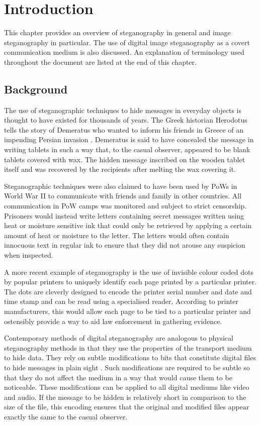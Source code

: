 \chapter{Introduction}
\label{ch:intro}
This chapter provides an overview of steganography in general and image steganography in particular. The use of digital image steganography as a covert communication medium is also discussed. An explanation of terminology used throughout the document are listed at the end of this chapter. 
\section{Background}
The use of steganographic techniques to hide messages in everyday objects is thought to have existed for thousands of years. The Greek historian Herodotus tells the story of Demeratus who wanted to inform his friends in Greece of an impending Persian invasion  \cite{kahn1996history}. Demeratus is said to have concealed the message in writing tablets in such a way that, to the casual observer, appeared to be blank tablets covered with wax. The hidden message inscribed on the wooden tablet itself and was recovered by the recipients after melting the wax covering it. 
\par Steganographic techniques were also claimed to have been used by PoWs in World War II to communicate with friends and family in other countries. All communication in PoW camps was monitored and subject to strict censorship. Prisoners would instead write letters containing secret messages written using heat or moisture sensitive ink that could only be retrieved by applying a certain amount of heat or moisture to the letter. The letters would often contain innocuous text in regular ink to ensure that they did not arouse any suspicion when inspected.
\par A more recent example of steganography is the use of invisible colour coded dots by popular printers \cite{stegprinter} to uniquely identify each page printed by a particular printer. The dots are cleverly designed to encode the printer serial number and date and time stamp and can be read using a specialised reader. According to printer manufacturers, this would allow each page to be tied to a particular printer and ostensibly provide a way to aid law enforcement in gathering evidence. 
\par Contemporary methods of digital steganography are analogous to physical steganography methods in that they use the properties of the transport medium to hide data. They rely on subtle modifications to bits that constitute digital files to hide messages in plain sight  \cite{hinson2009introduction}.  Such modifications are required to be subtle so that they do not affect the medium in a way that would cause them to be noticeable.  These  modifications can be applied to all digital mediums like video \cite{crawford2010supraliminal} and audio. If the message to be hidden is relatively short in comparison to the size of the file, this encoding ensures that the original and modified files appear exactly the same to the casual observer.

